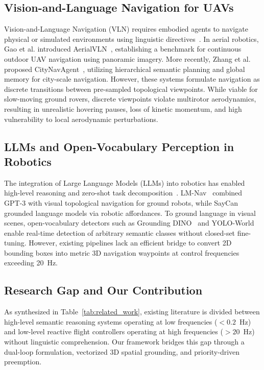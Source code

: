 \documentclass[conference]{IEEEtran}
\begin{document}
\subsection{Vision-and-Language Navigation for UAVs}
Vision-and-Language Navigation (VLN) requires embodied agents to navigate physical or simulated environments using linguistic directives~\cite{anderson2018vln}. In aerial robotics, Gao et al. introduced AerialVLN~\cite{gao2023aerialvln}, establishing a benchmark for continuous outdoor UAV navigation using panoramic imagery. More recently, Zhang et al. proposed CityNavAgent~\cite{zhang2024citynavagent}, utilizing hierarchical semantic planning and global memory for city-scale navigation. However, these systems formulate navigation as discrete transitions between pre-sampled topological viewpoints. While viable for slow-moving ground rovers, discrete viewpoints violate multirotor aerodynamics, resulting in unrealistic hovering pauses, loss of kinetic momentum, and high vulnerability to local aerodynamic perturbations.

\subsection{LLMs and Open-Vocabulary Perception in Robotics}
The integration of Large Language Models (LLMs) into robotics has enabled high-level reasoning and zero-shot task decomposition~\cite{shah2022lmnav,ahn2022saycan,huang2022inner}. LM-Nav~\cite{shah2022lmnav} combined GPT-3 with visual topological navigation for ground robots, while SayCan~\cite{ahn2022saycan} grounded language models via robotic affordances. To ground language in visual scenes, open-vocabulary detectors such as Grounding DINO~\cite{liu2023groundingdino} and YOLO-World~\cite{cheng2024yoloworld} enable real-time detection of arbitrary semantic classes without closed-set fine-tuning. However, existing pipelines lack an efficient bridge to convert 2D bounding boxes into metric 3D navigation waypoints at control frequencies exceeding 20~Hz.

\subsection{Research Gap and Our Contribution}
As synthesized in Table~\ref{tab:related_work}, existing literature is divided between high-level semantic reasoning systems operating at low frequencies ($<0.2$~Hz) and low-level reactive flight controllers operating at high frequencies ($>20$~Hz) without linguistic comprehension. Our framework bridges this gap through a dual-loop formulation, vectorized 3D spatial grounding, and priority-driven preemption.
\end{document}

